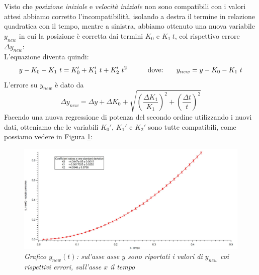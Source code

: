 \documentclass[12pt, a4paper]{article}
\begin{document}
Visto che \textit{posizione iniziale} e \textit{velocità iniziale} non sono compatibili con i valori attesi abbiamo corretto l'incompatibilità, isolando a destra il termine in relazione  quadratica con il tempo, mentre a sinistra, abbiamo ottenuto una nuova variabile $y_{new}$ in cui la posizione è corretta dai termini $K_0$ e $ K_1\ t$, col rispettivo errore $\Delta y_{new}$: \\
L'equazione diventa quindi:
\begin{equation*}
\begin{aligned}
  & & y - K_0 - K_1\ t = K_0'+K_1'\ t+K_{2}'\ t^2
  &\quad{} 
  \end{aligned}
  \begin{aligned}
  & &\text{dove:\phantom{.......}} y_{new} = y - K_0 - K_1\ t 
  &
  \end{aligned}
\end{equation*}
L'errore su  $y_{new}$ è dato da
\begin{equation*}
 \Delta y_{new} = \Delta y + \Delta K_0 + \sqrt{\left(\frac{\Delta K_1}{K_1}\right)^2 + \left(\frac{\Delta t}{t}\right)^2}
 \end{equation*}
Facendo una nuova regressione di potenza del secondo ordine utilizzando i nuovi dati, otteniamo che le variabili $K_0'$, $K_1'$ e $K_2'$ sono tutte compatibili, come possiamo vedere in Figura \ref{Grafico parabolico}:
\bigskip
\bigskip

    \begin{figure}[h]
\centering
\includegraphics[width=170mm]{Immagini/Graph1.jpg}
\caption{\textit{{\footnotesize{Grafico $y_{new}(t)$: sul'asse asse $y$ sono riportati i valori di $y_{new}$ coi rispettivi errori, sull'asse $x$ il tempo}}}}
\label{Grafico parabolico}
\end{figure}
\end{document}
